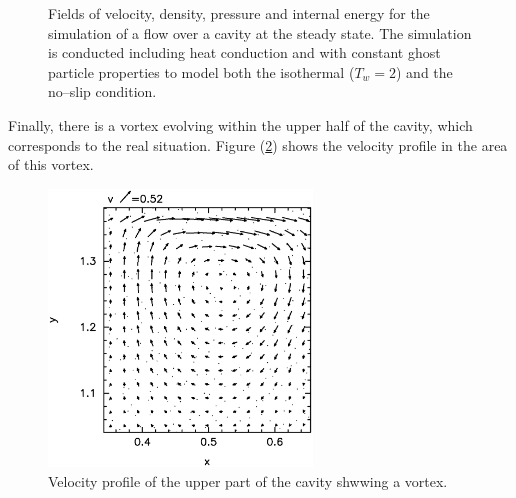 \documentclass{report}
\begin{document}
\begin{figure}[!htbp]

\centering
\label{fig:Cavities_steadyState}

\caption[Property fields for Cavity]{Fields of velocity, density, pressure and internal energy for the simulation of a flow over a cavity at the steady state. The simulation is conducted including heat conduction and with constant ghost particle properties to model both the isothermal ($T_w=2$) and the no--slip condition.}

\end{figure}


Finally, there is a vortex evolving within the upper half of the cavity, which corresponds to the real situation. Figure (\ref{fig:Cavity_vortex}) shows the velocity profile in the area of this vortex.


\begin{figure}
 \centering
\label{fig:Cavity_vortex}
\includegraphics[width=7cm]{Graphics/results/Porosities/Cavity/supLen_dx_4_dx0_2_SumDens_g0_2/vortex25}
\caption[Vortex in Cavity]{Velocity profile of the upper part of the cavity shwwing a vortex.}
\end{figure}
\end{document}
